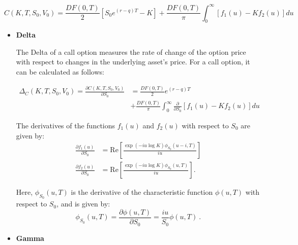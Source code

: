$$
C(K,T, S_0, V_0) = 
\frac{DF(0,T)}{2}\left[S_0e^{(r-q) T} - K\right] + \frac{DF(0,T)}{\pi}\int_0^{\infty}\left[f_1(u) - Kf_2(u)\right]du
$$


\begin{itemize}

\item \textbf{Delta} 

The Delta of a call option measures the rate of change of the option price with respect to changes in the underlying asset's price. For a call option, it can be calculated as follows:

$$
\begin{aligned}
\Delta_C(K,T, S_0, V_0) = \frac{ \partial C(K,T, S_0, V_0) }{\partial S_0} &= 
 \frac{DF(0,T)}{2}e^{(r-q) T} \\ &+ \frac{DF(0,T)}{\pi} \int_0^{\infty}\frac{ \partial  }{\partial S_0}  \left[f_1(u) - Kf_2(u)\right]du
\end{aligned}
$$

The derivatives of the functions $f_1(u)$ and $f_2(u)$ with respect to $S_0$ are given by:
\begin{equation}
\label{eq:derivative-s0-f1-f2}
\begin{aligned}
\frac{ \partial  f_1(u)   }{\partial S_0}&= \mathrm{Re}\left[  \frac{\exp(-iu\log K) \phi_{S_0}(u-i,T)   }{iu}\right]   \\  
\frac{\partial f_2(u)   }{\partial S_0} &= \mathrm{Re}\left[ \frac{\exp(-iu\log K) \phi_{S_0}(u,T)  }{iu}\right].
\end{aligned}
\end{equation}

Here, $\phi_{S_0}(u,T)$ is the derivative of the characteristic function $\phi(u,T)$ with respect to $S_0$, and is given by:
$$
\phi_{S_0}(u,T) = \frac{ \partial  \phi(u,T)}{\partial S_0} = \frac{iu}{S_0} \phi(u,T) \ . 
$$


\item \textbf{Gamma} 


\end{itemize}
